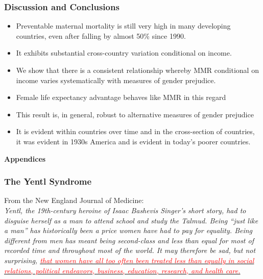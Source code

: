 \documentclass[10pt,letterpaper,subeqn]{beamer}
\begin{document}
\begin{frame}
\frametitle{Discussion and Conclusions}
\begin{itemize}
	\item Preventable maternal mortality is still very high in many developing 
        countries, even after falling by almost 50\% since 1990.
	\item It exhibits substantial cross-country variation conditional on income.
	\item We show that there is a consistent relationship whereby MMR conditional 
        on income varies systematically with measures of gender prejudice.
	\item Female life expectancy advantage behaves like MMR in this regard
	\item This result is, in general, robust to alternative measures of gender 
        prejudice
	\item It is evident within countries over time and in the cross-section of
        countries, it was evident in 1930s America and is evident in today's
        poorer countries.
\end{itemize}
\end{frame}





\begin{frame}[plain]
\begin{center}
\textbf{Appendices}
\end{center}
\end{frame}


\begin{frame}[label=Yentl]
\frametitle{The Yentl Syndrome}
From the New England Journal of Medicine: \\
\vspace{4mm}
\textit{Yentl, the 19th-century heroine of Isaac Bashevis Singer's short story, 
had to disguise herself as a man to attend school and study the Talmud. Being 
``just like a man'' has historically been a price women have had to pay for 
equality. Being different from men has meant being second-class and less than 
equal for most of recorded time and throughout most of the world. It may therefore 
be sad, but not surprising, \hyperlink{intro}{\textcolor{red}{that women have all 
too often been treated less than equally in social relations, political endeavors, 
business, education, research, and health care.}}}\\
\end{frame}
\end{document}
